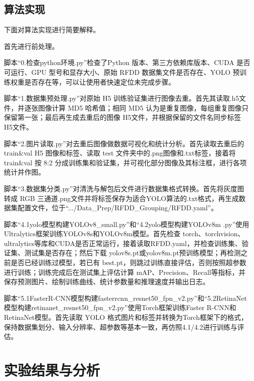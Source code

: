 \documentclass[12pt, oneside, a4paper]{ctexart}
\begin{document}
\subsection{算法实现}
\par{}
下面对算法实现进行简要解释。
\par{}
首先进行前处理。
\par{}
脚本“{0.检查python环境.py}”检查了Python 版本、第三方依赖库版本、CUDA 是否可运行、GPU 型号和显存大小、原始 RFDD 数据集文件是否存在、YOLO 预训练权重是否存在等，可以让使用者快速定位未完成步骤。
\par{}
脚本“{1.数据集预处理.py}”对原始 H5 训练验证集进行图像去重。首先其读取.h5文件，并逐张图像计算 MD5 哈希值；相同 MD5 认为是重复图像，每组重复图像只保留第一张；最后再生成去重后的图像 H5文件，并根据保留的文件名同步标签 H5文件。
\par{}
脚本“{2.图片读取.py}”对去重后图像做数据可视化和统计分析。首先读取去重后的 train\&val H5 图像和标签、读取 test 文件夹中的.png图像和.txt标签，接着将 train\&val 按 8:2 分成训练集和验证集，并可视化部分图像及其标注框，进行各项统计并作图。
\par{}
脚本“{3.数据集分类.py}”对清洗与解包后文件进行数据集格式转换。首先将灰度图转成 RGB 三通道.png文件并将标签保存为适合YOLO算法的.txt格式，再生成数据集配置文件，位于“.../Data\_Prep/RFDD\_Grouping/RFDD.yaml”。
\par{}
脚本“{4.1yolo模型构建YOLOv8\_small.py}”和“{4.2yolo模型构建YOLOv8m .py}”使用Ultralytics框架训练YOLOv8s和YOLOv8m模型。首先检查 torch、torchvision、ultralytics等库和CUDA是否正常运行，接着读取RFDD.yaml，并检查训练集、验证集、测试集是否存在；然后下载 yolov8s.pt或yolov8m.pt预训练模型；再检测之前是否已经训练过模型，若已有 best.pt，则跳过训练直接评估，否则按照超参数进行训练；训练完成后在测试集上评估计算 mAP、Precision、Recall等指标，并保存预测图片、绘制训练曲线、统计参数量和推理速度并输出日志。
\par{}
脚本“{5.1FasterR-CNN模型构建fasterrcnn\_resnet50\_fpn\_v2.py}”和“{5.2RetinaNet模型构建retinanet\_resnet50\_fpn\_v2.py}”使用Torch框架训练Faster R-CNN和RetinaNet模型。首先读取 YOLO 格式图片和标签并转换为Torch框架下的格式，保持数据集划分、输入分辨率、超参数等基本一致，再仿照4.1/4.2进行训练与评估。
\par{}
\quad{}
\par{}
\section{实验结果与分析}
\end{document}
